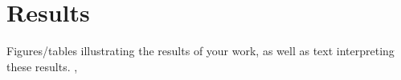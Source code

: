 \documentclass{6838publ}
\newcommand\sN{\ensuremath{\mathcal{N}}}
\newcommand\R{\ensuremath{\mathbb{R}}} %
\DeclareMathOperator*{\diag}{diag} %
\begin{document}














 






 



\section{Results}

Figures/tables illustrating the results of your work, as well as text interpreting these results. \cite{peyreComputationalOptimalTransport2020},

\newpage
\newpage



\end{document}
